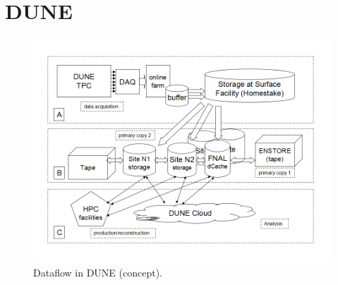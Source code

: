 \section{DUNE}

\begin{figure}[h!]
\centering
\includegraphics[width=\textwidth]{DUNEdataflow.png}
\caption{Dataflow in DUNE (concept).}
\label{fig:DUNEdataflow}
\end{figure}